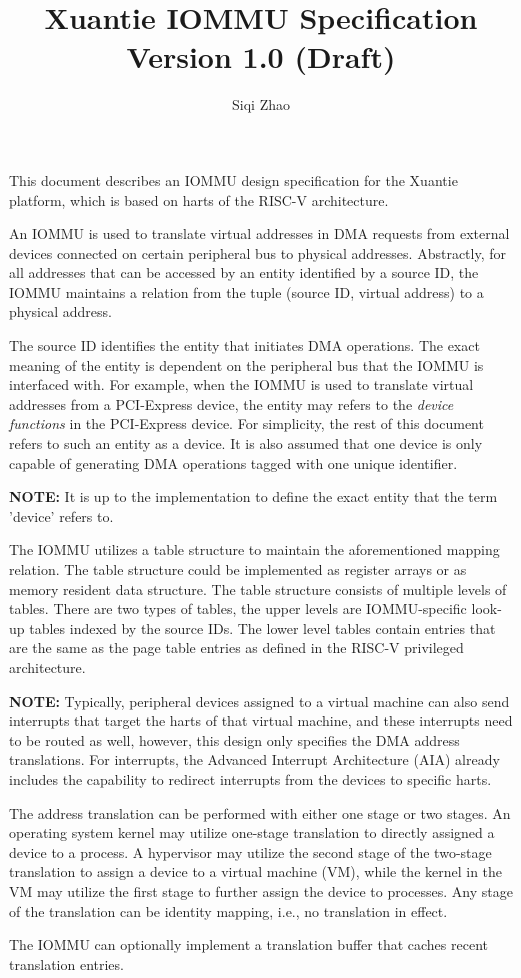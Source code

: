 \documentclass[12pt]{article}
\newcommand{\note}{\vspace{1em}\textbf{NOTE: }}
\newcommand{\noteend}{\vspace{1em}}
\begin{document}
\title{Xuantie IOMMU Specification Version 1.0 (Draft)}
\author{Siqi Zhao}
\maketitle


This document describes an IOMMU design specification for the Xuantie platform, which is
based on harts of the RISC-V architecture.

An IOMMU is used to translate virtual addresses in DMA requests from external devices
connected on certain peripheral bus to physical addresses. Abstractly, for all addresses
that can be accessed by an entity identified by a source ID, the IOMMU maintains a relation
from the tuple (source ID, virtual address) to a physical address.

The source ID identifies the entity that initiates DMA operations. The exact meaning of
the entity is dependent on the peripheral bus that the IOMMU is
interfaced with. For example, when the IOMMU is used to translate virtual addresses from
a PCI-Express device, the entity may refers to the \textit{device functions} in the
PCI-Express device. For simplicity, the rest of this document refers to such an entity as
a device. It is also assumed that one device is only capable of generating DMA operations
tagged with one unique identifier.

\note It is up to the implementation to define the exact entity that the term 'device'
refers to. \noteend

The IOMMU utilizes a table structure to maintain the aforementioned
mapping relation. The table structure could be implemented as register arrays or as memory
resident data structure. The table structure consists of multiple levels of tables. There are two
types of tables, the upper levels are IOMMU-specific look-up tables indexed by the source
IDs. The lower level tables contain entries that are the same as the page table entries as
defined in the RISC-V privileged architecture.

\note Typically, peripheral devices assigned to a virtual machine can also send interrupts
that target the harts of that virtual machine, and these interrupts need to be routed as
well, however, this design only specifies the DMA address translations. For interrupts,
the Advanced Interrupt Architecture (AIA) already includes the capability to redirect
interrupts from the devices to specific harts.\noteend

The address translation can be performed with either one stage or two stages. An operating
system kernel may utilize one-stage translation to directly assigned a device to a
process. A hypervisor may utilize the second stage of the two-stage translation to assign
a device to a virtual machine (VM), while the kernel in the VM may utilize the first stage
to further assign the device to processes. Any stage of the translation can be identity
mapping, i.e., no translation in effect.

The IOMMU can optionally implement a translation buffer that caches recent translation
entries. 











\end{document}
